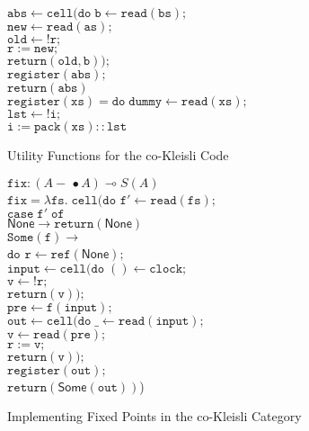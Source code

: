 \documentclass[preprint]{sigplanconf}
\newcommand{\term}[1]{\ensuremath{\mathtt{{#1}}}}
\newcommand{\lolli}{\multimap}
\newcommand{\lollishrink}{-\!\!\!\,\bullet}
\newcommand{\None}{\mathsf{None}}
\newcommand{\Some}[1]{\mathsf{Some}({#1})}
\begin{document}
\begin{figure}
\begin{tabbing}
\>           \>    \>               \>\term{abs \leftarrow cell(do\;}\=\term{b \leftarrow read(bs);} \\
\>           \>    \>               \>                               \>\term{new \leftarrow read(as);} \\
\>           \>    \>               \>                               \>\term{old \leftarrow !r;}\\
\>           \>    \>               \>                               \>\term{r := new;}\\
\>           \>    \>               \>                               \>\term{return(old,b));}\\
\>           \>    \>               \>\term{register(abs);} \\
\>           \>    \>               \>\term{return(abs)} 
\\[1em]

\term{register(xs) = do\;}\=\term{dummy \leftarrow read(xs);}\\
                          \>\term{lst \leftarrow !i;} \\
                          \>\term{i := pack(xs) :: lst} 
\end{tabbing}
\caption{Utility Functions for the co-Kleisli Code}
\label{cokleisli-util}
\end{figure}

\begin{figure}
\begin{tabbing}
$\term{fix} : (A \lollishrink A) \lolli S(A)$ \\
\term{fix = \lambda fs.\;cell(do}
  \=\term{f' \leftarrow read(fs);} \\
  \>\term{case\;f'\;of}\\
  \>\;\;\=\term{\None \to return(\None)}\\
  \>    \>\term{Some(f) \to} \\
  \>    \>\;\;\term{do} \=\term{r \leftarrow ref(\None);}\\
  \>    \>  \>\term{input \leftarrow cell(do\;}\=\term{() \leftarrow clock;}\\
  \>    \>  \>                                 \>\term{v \leftarrow !r;}\\
  \>    \>  \>                                 \>\term{return(v));}\\
  \>    \>  \>\term{pre \leftarrow f(input);}\\
  \>    \>  \>\term{out \leftarrow cell(do\;}\=\term{\_ \leftarrow read(input);} \\
  \>    \>  \>                               \>\term{v \leftarrow read(pre);}\\
  \>    \>  \>                               \>\term{r := v;}\\
  \>    \>  \>                               \>\term{return(v));}\\
  \>    \>  \>\term{register(out);}\\
  \>    \>  \>\term{return(\Some{out})})
\end{tabbing}
\caption{Implementing Fixed Points in the co-Kleisli Category}  
\label{cokleisli-implementation-2}
\end{figure}
\end{document}
